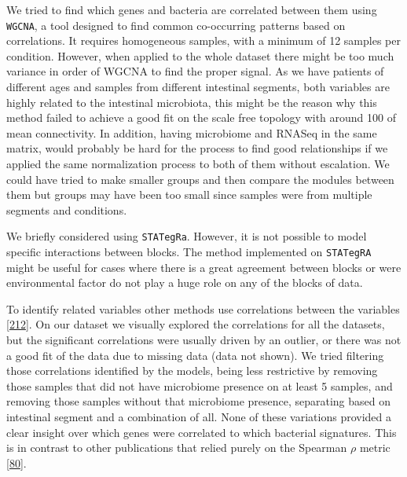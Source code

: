 \documentclass[
  12pt,
  a4paper,
  twoside,
  openright]{book}
\begin{document}
We tried to find which genes and bacteria are correlated between them using \texttt{WGCNA}, a tool designed to find common co-occurring patterns based on correlations.
It requires homogeneous samples, with a minimum of 12 samples per condition.
However, when applied to the whole dataset there might be too much variance in order of WGCNA to find the proper signal.
As we have patients of different ages and samples from different intestinal segments, both variables are highly related to the intestinal microbiota, this might be the reason why this method failed to achieve a good fit on the scale free topology with around 100 of mean connectivity.
In addition, having microbiome and RNASeq in the same matrix, would probably be hard for the process to find good relationships if we applied the same normalization process to both of them without escalation.
We could have tried to make smaller groups and then compare the modules between them but groups may have been too small since samples were from multiple segments and conditions.

We briefly considered using \texttt{STATegRa}.
However, it is not possible to model specific interactions between blocks.
The method implemented on \texttt{STATegRA} might be useful for cases where there is a great agreement between blocks or were environmental factor do not play a huge role on any of the blocks of data.

To identify related variables other methods use correlations between the variables {[}\protect\hyperlink{ref-vila-casadesuxfas2016}{212}{]}.
On our dataset we visually explored the correlations for all the datasets, but the significant correlations were usually driven by an outlier, or there was not a good fit of the data due to missing data (data not shown).
We tried filtering those correlations identified by the models, being less restrictive by removing those samples that did not have microbiome presence on at least 5 samples, and removing those samples without that microbiome presence, separating based on intestinal segment and a combination of all.
None of these variations provided a clear insight over which genes were correlated to which bacterial signatures.
This is in contrast to other publications that relied purely on the Spearman \(\rho\) metric {[}\protect\hyperlink{ref-hasler_uncoupling_2016}{80}{]}.
\end{document}

